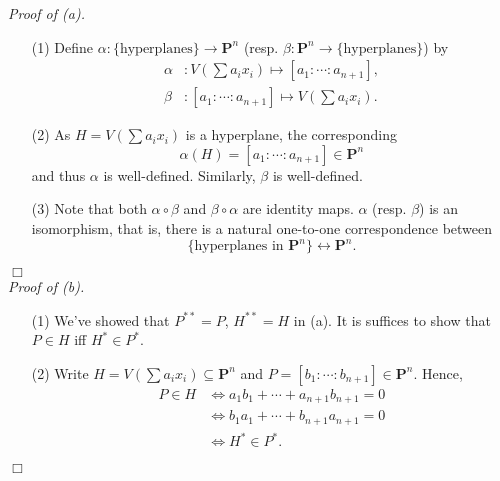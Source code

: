 \documentclass{article}
\begin{document}
\emph{Proof of (a).}
\begin{enumerate}
\item[(1)]
  Define $\alpha: \{ \text{hyperplanes} \} \to \mathbf{P}^n$
  (resp. $\beta: \mathbf{P}^n \to \{ \text{hyperplanes} \}$) by
  \begin{align*}
    \alpha &: V\left( \sum a_i x_i \right) \mapsto [a_1 : \cdots : a_{n+1}], \\
    \beta &: [a_1 : \cdots : a_{n+1}] \mapsto V\left( \sum a_i x_i \right).
  \end{align*}

\item[(2)]
  As $H = V\left( \sum a_i x_i \right)$ is a hyperplane,
  the corresponding
  \[
    \alpha(H) = [a_1 : \cdots : a_{n+1}] \in \mathbf{P}^n
  \]
  and thus $\alpha$ is well-defined.
  Similarly, $\beta$ is well-defined.

\item[(3)]
  Note that both $\alpha \circ \beta$ and $\beta \circ \alpha$ are identity maps.
  $\alpha$ (resp. $\beta$) is an isomorphism, that is,
  there is a natural one-to-one correspondence between
  \[
    \{ \text{hyperplanes in $\mathbf{P}^n$} \} \longleftrightarrow \mathbf{P}^n.
  \]
\end{enumerate}
$\Box$ \\



\emph{Proof of (b).}
\begin{enumerate}
\item[(1)]
  We've showed that $P^{**} = P$, $H^{**} = H$ in (a).
  It is suffices to show that $P \in H$ iff $H^{*} \in P^{*}$.

\item[(2)]
  Write $H = V\left( \sum a_i x_i \right) \subseteq \mathbf{P}^n$ and
  $P = [b_1 : \cdots : b_{n+1}] \in \mathbf{P}^n$.
  Hence,
  \begin{align*}
    P \in H
    &\Longleftrightarrow
      a_1 b_1 + \cdots + a_{n+1} b_{n+1} = 0 \\
    &\Longleftrightarrow
      b_1 a_1 + \cdots + b_{n+1} a_{n+1} = 0 \\
    &\Longleftrightarrow
      H^{*} \in P^{*}.
  \end{align*}
\end{enumerate}
$\Box$ \\\\



\end{document}
